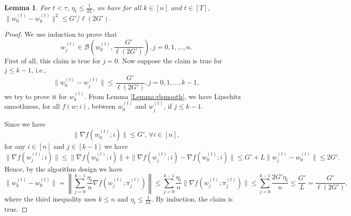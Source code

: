 \documentclass{article} %
\theoremstyle{plain}
\newtheorem{Lemma}[theorem]{Lemma}
\theoremstyle{definition}
\theoremstyle{remark}
\begin{document}
\begin{Lemma}
\label{Lemma:epsilon}
For $t<\tau$, $\eta_t \leq \frac{1}{2L}$, we have for all $k\in[n]$ and $t\in[T]$, $\|w^{(t)}_0-w^{(t)}_k\|^2\leq G'/\ell(2G').$
\end{Lemma}

\begin{proof}
    We use induction to prove that 
\[
w_j^{(t)} \in \mathcal{B}(w_0^{(t)}, \frac{G'}{\ell(2G')}), j = 0, 1, \ldots, n.
\]
First of all, this claim is true for \( j = 0 \). Now suppose the claim is true for $j\leq k-1$, i.e., 
\[
\|w_0^{(t)} - w_j^{(t)}\| \leq \frac{G'}{\ell(2G')}, j = 0, 1, \ldots, k-1,
\]
we try to prove it for \( w_k^{(t)} \). From Lemma \ref{Lemma:rlsmooth}, we have Lipschitz smoothness, for all $f(w;i)$, between $w^{(t)}_0$ and $w^{(t)}_j$, if $j\leq k-1$.

Since we have  
\[
\|\nabla f(w_0^{(t)};i)\| \leq G', \, \forall i \in [n],
\]
for any \( i \in [n] \) and \( j \in [k-1] \) we have
\[
\|\nabla f(w_j^{(t)};i)\| \leq \|\nabla f(w_0^{(t)};i)\| + \|\nabla f(w_j^{(t)};i) - \nabla f(w_0^{(t)};i)\| \leq G' + L \|w_j^{(t)} - w_0^{(t)}\| \leq 2G'.
\]
Hence, by the algorithm design we have
\[
\|w_k^{(t)} - w_0^{(t)}\| = \left\|\sum_{j=0}^{k-1} \frac{\eta_t}{n} \nabla f(w_j^{(t)}; \pi_j^{(t)})\right\| \leq \sum_{j=0}^{k-1} \frac{\eta_t}{n} \|\nabla f(w_j^{(t)}; \pi_j^{(t)})\| \leq \sum_{j=0}^{k-1} \frac{2G' \eta_t}{n} \leq \frac{G'}{L} = \frac{G'}{\ell(2G')},
\]
where the third inequality uses \( k \leq n \) and \( \eta_t \leq \frac{1}{2L}.
\) By induction, the claim is true.
\end{proof}


\end{document}
